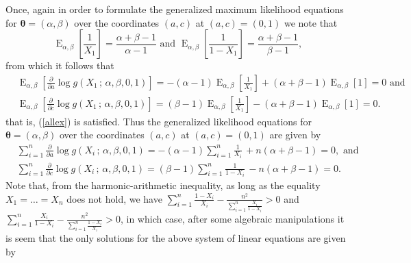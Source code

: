 \documentclass[10pt,a4paper,onecolumn]{article} %
\newcommand{\bs}{\boldsymbol}
\newcommand{\on}{\operatorname}
\begin{document}
Once, again in order to formulate the generalized maximum likelihood equations for $\bs{\theta}=(\alpha,\beta)$ over the coordinates $(a,c)$ at $(a,c)=(0,1)$ we note that
\begin{equation}\label{relations2}\on{E}_{\alpha,\beta}\left[\frac{1}{X_1}\right]=\frac{\alpha+\beta-1}{\alpha-1}\mbox{ and }\on{E}_{\alpha,\beta}\left[\frac{1}{1-X_1}\right]=\frac{\alpha+\beta-1}{\beta-1},
\end{equation}
from which it follows that
\begin{equation*}
\begin{aligned}
&\on{E}_{\alpha,\beta} \left[\frac{\partial}{\partial a}  \log g(X_1\,;\,\alpha,\beta,0,1)\right] = -(\alpha-1) \on{E}_{\alpha,\beta}\left[\frac{1}{X_1}\right] + (\alpha+\beta-1) \on{E}_{\alpha,\beta}\left[1\right]=0\mbox{ and}\\
&\on{E}_{\alpha,\beta} \left[\frac{\partial}{\partial c}  \log g(X_1\,;\,\alpha,\beta,0,1)\right] =(\beta-1) \on{E}_{\alpha,\beta}\left[\frac{1}{X_1}\right] - (\alpha+\beta-1) \on{E}_{\alpha,\beta}\left[1\right]=0.
\end{aligned}
\end{equation*}
that is, (\ref{allex}) is satisfied. Thus  the generalized likelihood equations for $\bs{\theta}=(\alpha,\beta)$ over the coordinates $(a,c)$ at $(a,c)=(0,1)$ are given by
\begin{equation*}
\begin{aligned}
&\sum_{i=1}^n \frac{\partial}{\partial a}  \log g(X_i\,;\,\alpha,\beta,0,1)=-(\alpha -1)\sum _{i=1}^{n}{\frac {1}{X_{i}}}\,+n(\alpha +\beta -1)=0,\mbox{ and }\\
&\sum_{i=1}^n \frac{\partial}{\partial c}  \log g(X_i\,;\,\alpha,\beta,0,1)=(\beta-1)\sum _{i=1}^{n}{\frac {1}{1-X_{i}}}\,-n(\alpha +\beta -1)=0.
\end{aligned}
\end{equation*}
Note that, from the harmonic-arithmetic inequality, as long as the equality $X_1=\ldots=X_n$ does not hold, we have $\sum_{i=1}^{n}\frac{1-X_i}{X_i}-\frac{n^2}{\sum_{i=1}^{n}\frac{X_i}{1-X_i}}>0$ and $\sum_{i=1}^{n}\frac{X_i}{1-X_i}-\frac{n^2}{\sum_{i=1}^{n}\frac{1-X_i}{X_i}}>0$, in which case, after some algebraic manipulations it is seem that the only solutions for the above system of linear equations are given by
\end{document}
